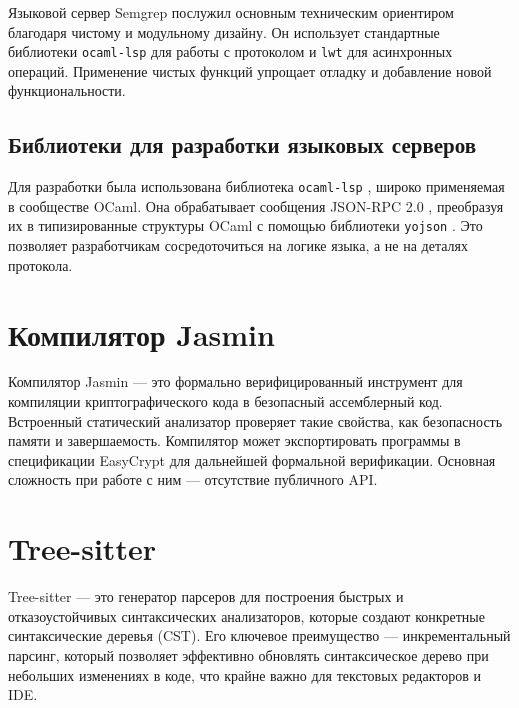 Языковой сервер Semgrep \cite{gh-semgrep-lsp} послужил основным техническим
ориентиром благодаря чистому и модульному дизайну. Он использует стандартные
библиотеки \texttt{ocaml-lsp} \cite{opam-ocaml-lsp} для работы с протоколом и
\texttt{lwt} \cite{opam-lwt} для асинхронных операций. Применение чистых функций
упрощает отладку и добавление новой функциональности.

\subsection*{Библиотеки для разработки языковых серверов}

Для разработки была использована библиотека \texttt{ocaml-lsp}
\cite{opam-ocaml-lsp}, широко применяемая в сообществе OCaml. Она обрабатывает
сообщения JSON-RPC 2.0 \cite{jsonrpc:2010}, преобразуя их в типизированные
структуры OCaml с помощью библиотеки \texttt{yojson} \cite{gh-yojson}. Это
позволяет разработчикам сосредоточиться на логике языка, а не на деталях
протокола.

\section{Компилятор Jasmin}

Компилятор Jasmin \cite{jasmin:2017} — это формально верифицированный инструмент
для компиляции криптографического кода в безопасный ассемблерный код. Встроенный
статический анализатор проверяет такие свойства, как безопасность памяти и
завершаемость. Компилятор может экспортировать программы в спецификации
EasyCrypt \cite{easycrypt:2013} для дальнейшей формальной верификации. Основная
сложность при работе с ним — отсутствие публичного API.

\section{Tree-sitter}

Tree-sitter \cite{tree-sitter} — это генератор парсеров для построения быстрых и
отказоустойчивых синтаксических анализаторов, которые создают конкретные
синтаксические деревья (CST). Его ключевое преимущество — инкрементальный
парсинг, который позволяет эффективно обновлять синтаксическое дерево при
небольших изменениях в коде, что крайне важно для текстовых редакторов и IDE.